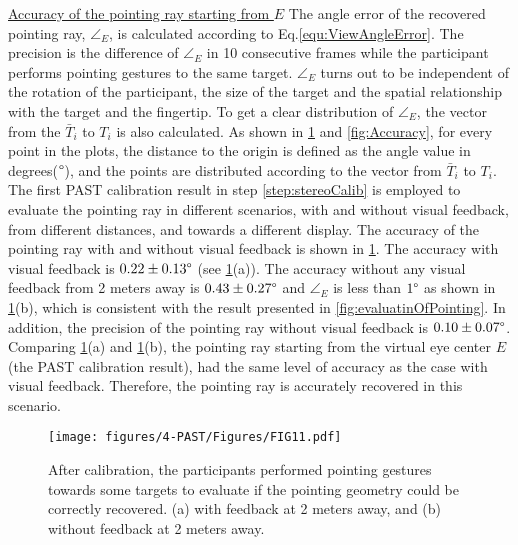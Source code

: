 \underline{Accuracy of the pointing ray starting from $E$} 
The angle error of the recovered pointing ray, ${\angle}_{E}$, is calculated according to {Eq.\ref{equ:ViewAngleError}}. The precision is the difference of ${\angle}_{E}$ in 10 consecutive frames while the participant performs pointing gestures to the same target. ${\angle}_{E}$ turns out to be independent of the rotation of the participant, the size of the target and the spatial relationship with the target and the fingertip. To get a clear distribution of ${\angle}_{E}$, the vector from the $\bar T_i$ to $T_i$ is also calculated. As shown in \figurename{ \ref{fig:Accuracy2m}} and \figurename{ \ref{fig:Accuracy}}, for every point in the plots, the distance to the origin is defined as the angle value in degrees($\degree$), and the points are distributed according to the vector from $\bar T_i$ to $T_i$.
The first PAST calibration result in step \ref{step:stereoCalib} is employed to evaluate the pointing ray in different scenarios, with and without visual feedback, from different distances, and towards a different display.
The accuracy of the pointing ray with and without visual feedback is shown in \figurename{ \ref{fig:Accuracy2m}}. The accuracy with visual feedback is  $0.22\pm0.13\degree$ (see \figurename{ \ref{fig:Accuracy2m}(a)}).
The accuracy without any visual feedback from 2 meters away is $0.43\pm0.27\degree$ and ${\angle}_{E}$ is less than $1\degree$ as shown in \figurename{ \ref{fig:Accuracy2m}(b)}, which is consistent with the result presented in \figurename{ \ref{fig:evaluatinOfPointing}}. In addition, the precision of the pointing ray without visual feedback is  $0.10\pm0.07\degree$.
Comparing \figurename{ \ref{fig:Accuracy2m}(a)} and \figurename{ \ref{fig:Accuracy2m}(b)}, the pointing ray starting from the virtual eye center $E$ (the PAST calibration result), had the same level of accuracy as the case with visual feedback. Therefore, the pointing ray is accurately recovered in this scenario.
\begin{figure} 
	\centering
	\texttt{[image: figures/4-PAST/Figures/FIG11.pdf]}
	\caption{After calibration, the participants performed pointing gestures towards some targets to evaluate if the pointing geometry could be correctly recovered. (a) with feedback at 2 meters away, and (b) without feedback at 2 meters away.}
	\label{fig:Accuracy2m}
\end{figure}

